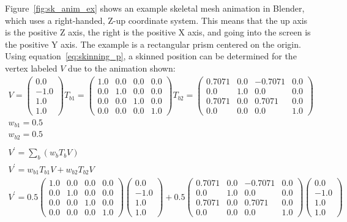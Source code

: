 Figure~\ref{fig:sk_anim_ex} shows an example skeletal mesh animation in Blender, which uses a right-handed, Z-up coordinate system.
This means that the up axis is the positive Z axis, the right is the positive X axis, and going into the screen is the positive Y axis.
The example is a rectangular prism centered on the origin.
Using equation~\ref{eq:skinning_p}, a skinned position can be determined for the vertex labeled $V$ due to the animation shown:
\begin{gather}
 \label{eq:skinning_ex}
 V = \left(\begin{array}{c}0.0\\-1.0\\1.0\\1.0\end{array}\right)
 T_{b1} = \left(\begin{array}{cccc}1.0&0.0&0.0&0.0\\0.0&1.0&0.0&0.0\\0.0&0.0&1.0&0.0\\0.0&0.0&0.0&1.0\end{array}\right)
 T_{b2} = \left(\begin{array}{cccc}0.7071&0.0&-0.7071&0.0\\0.0&1.0&0.0&0.0\\0.7071&0.0&0.7071&0.0\\0.0&0.0&0.0&1.0\end{array}\right)\nonumber\\
 w_{b1} = 0.5\nonumber\\
 w_{b2} = 0.5\nonumber\\\nonumber\\
 V^\prime = \sum_b{\left(w_bT_bV\right)}\nonumber\\
 V^\prime = w_{b1}T_{b1}V + w_{b2}T_{b2}V\nonumber\\
 V^\prime = 0.5\left(\begin{array}{cccc}1.0&0.0&0.0&0.0\\0.0&1.0&0.0&0.0\\0.0&0.0&1.0&0.0\\0.0&0.0&0.0&1.0\end{array}\right)\left(\begin{array}{c}0.0\\-1.0\\1.0\\1.0\end{array}\right) + 0.5\left(\begin{array}{cccc}0.7071&0.0&-0.7071&0.0\\0.0&1.0&0.0&0.0\\0.7071&0.0&0.7071&0.0\\0.0&0.0&0.0&1.0\end{array}\right)\left(\begin{array}{c}0.0\\-1.0\\1.0\\1.0\end{array}\right)\nonumber\\

\end{gather}
